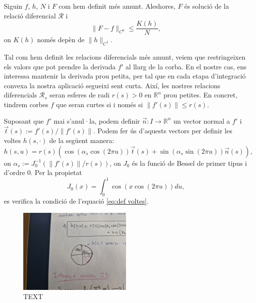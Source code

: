 \begin{lema}\label{lema:C0-1D}
    Siguin $f$, $h$, $N$ i $F$ com hem definit més amunt. Aleshores, $F$ és solució de la relació diferencial $\mathcal R$ i 
    \begin{equation}
    \|F-f\|_{C^0} \le \frac{K(h)}{N},
    \end{equation}
    on $K(h)$ només depèn de $\|h\|_{C^1}$.
\end{lema}

Tal com hem definit les relacions diferencials més amunt, veiem que restringeixen els valors que pot prendre la derivada $f'$ al llarg de la corba. En el nostre cas, ens interessa mantenir la derivada prou petita, per tal que en cada etapa d'integració convexa la nostra aplicació segueixi sent curta. Així, les nostres relacions diferencials $\mathcal R_s$ seran esferes de radi $r(s)>0$ en $\mathbb R^n$ prou petites. En concret, tindrem corbes $f$ que seran curtes si i només si $\|f'(s)\|\le r(s)$.

Suposant que $f'$ mai s'anul·la, podem definir $\vec n:I\to\mathbb R^n$ un vector normal a $f'$ i $\vec t(s):=f'(s)/\|f'(s)\|$. Podem fer ús d'aquests vectors per definir les voltes $h(s, \cdot)$ de la següent manera:
\begin{equation*}
    h(s, u) = r(s)(\cos(\alpha_s\cos(2\pi u))\vec t(s) + \sin(\alpha_s\sin(2\pi u))\vec n(s)),
\end{equation*}
on $\alpha_s := J_0^{-1}(\|f'(s)\|/r(s))$, on $J_0$ és la funció de Bessel de primer tipus i d'ordre 0. Per la propietat
\begin{equation*}
    J_0(x) = \int_0^1 \cos(x\cos(2\pi u)) du,
\end{equation*}
es verifica la condició de l'equació \eqref{eq:def voltes}.

\begin{figure}[htbp]
    \centering
    \includegraphics[width=0.5\textwidth]{Fotos/SISENA.jpg}
    \caption{{\color{blue}TEXT}}
    \label{fig:sisena_foto}
\end{figure}


